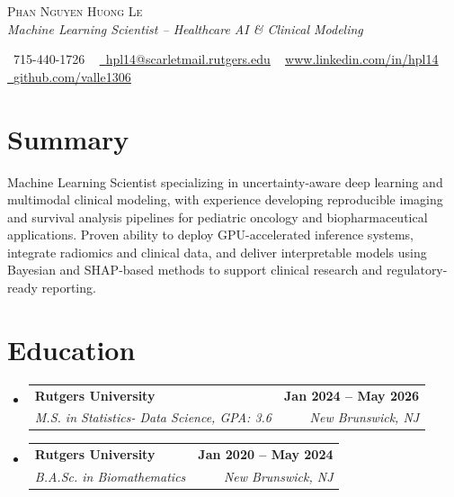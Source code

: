 \documentclass[letterpaper,11pt]{article}
\makeatletter
\newcommand{\resumeSubheading}[4]{
  \vspace{-2pt}\item
    \begin{tabular*}{1.0\textwidth}[t]{l@{\extracolsep{\fill}}r}
      \textbf{#1} & \textbf{\small #2} \\
      \textit{\small#3} & \textit{\small #4} \\
    \end{tabular*}\vspace{-7pt}
}
\newcommand{\resumeSubHeadingListStart}{\begin{itemize}[leftmargin=0.0in, label={}]}
\newcommand{\resumeSubHeadingListEnd}{\end{itemize}}
\makeatother
\begin{document}
\begin{center}
    {\Huge \scshape Phan Nguyen Huong Le} \\ \vspace{1pt}
    {\large \itshape Machine Learning Scientist – Healthcare AI \& Clinical Modeling} \\ \vspace{4pt}

    \small \raisebox{-0.1\height}\faPhone\ 715-440-1726 ~ \href{mailto:hpl14@scarletmail.rutgers.edu}{\raisebox{-0.2\height}\faEnvelope\  \underline{hpl14@scarletmail.rutgers.edu}} ~
    \href{https://linkedin.com/in/hpl14}{\raisebox{-0.2\height}\faLinkedin\underline{www.linkedin.com/in/hpl14}}  ~
    \href{https://github.com/valle1306}{\raisebox{-0.2\height}\faGithub\ \underline{github.com/valle1306}}
    \newline
    \vspace{-20pt}
\end{center}

\vspace{-15pt}
\section{Summary}
Machine Learning Scientist specializing in uncertainty-aware deep learning and multimodal clinical modeling, with experience developing reproducible imaging and survival analysis pipelines for pediatric oncology and biopharmaceutical applications. Proven ability to deploy GPU-accelerated inference systems, integrate radiomics and clinical data, and deliver interpretable models using Bayesian and SHAP-based methods to support clinical research and regulatory-ready reporting.
\vspace{-10pt}
\section{Education}
\resumeSubHeadingListStart
  \resumeSubheading{Rutgers University}{Jan 2024 -- May 2026}{M.S. in Statistics- Data Science, GPA: 3.6}{New Brunswick, NJ}
  \vspace{-5pt}
  \resumeSubheading{Rutgers University}{Jan 2020 -- May 2024}{B.A.Sc. in Biomathematics}{New Brunswick, NJ}
  \vspace{-15pt}
\resumeSubHeadingListEnd

\end{document}
